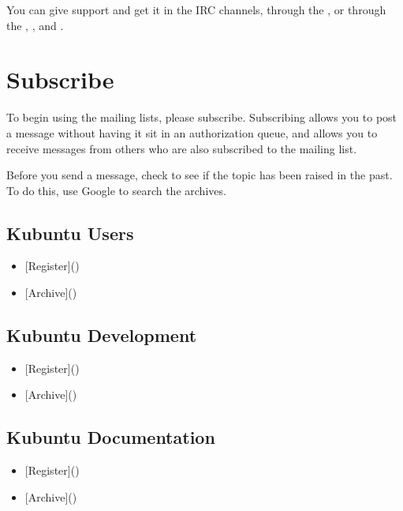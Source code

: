 \documentclass[letterpaper,10pt,english]{sphinxmanual}
\begin{document}
You can give support and get it in the IRC channels, through the , or through the , , and .


\section{Subscribe}
\label{\detokenize{docs/contribute:subscribe}}
To begin using the mailing lists, please subscribe. Subscribing allows you to post a message without having it sit in an authorization queue, and allows you to receive messages from others who are also subscribed to the mailing list.

Before you send a message, check to see if the topic has been raised in the past. To do this, use Google to search the archives.


\subsection{Kubuntu Users}
\label{\detokenize{docs/contribute:kubuntu-users}}\begin{itemize}
\item {} 
{[}Register{]}()

\item {} 
{[}Archive{]}()

\end{itemize}


\subsection{Kubuntu Development}
\label{\detokenize{docs/contribute:kubuntu-development}}\begin{itemize}
\item {} 
{[}Register{]}()

\item {} 
{[}Archive{]}()

\end{itemize}


\subsection{Kubuntu Documentation}
\label{\detokenize{docs/contribute:kubuntu-documentation}}\begin{itemize}
\item {} 
{[}Register{]}()

\item {} 
{[}Archive{]}()

\end{itemize}
\end{document}
